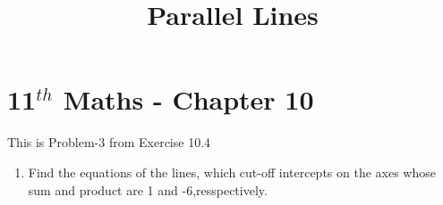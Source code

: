\documentclass[12pt]{article}
\begin{document}
\begin{center}
\title{\textbf{Parallel Lines}}
\date{\vspace{-5ex}} %
\maketitle
\end{center}
\setcounter{page}{1}
\section*{11$^{th}$ Maths - Chapter 10}
This is Problem-3 from Exercise 10.4
\begin{enumerate}
\item Find the equations of the lines, which cut-off intercepts on the axes whose sum and product are 1 and -6,resspectively.

\end{enumerate}
\end{document}
